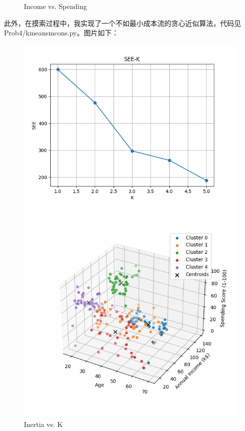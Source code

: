 \documentclass[8pt]{article}
\begin{document}
\begin{figure}[H]
\begin{minipage}{0.32\textwidth}
        \caption{Income vs. Spending}
        \label{fig: Annual Income vs. Spending Score k5 com con min20}
    \end{minipage}
    \hfill
\end{figure}

此外，在摸索过程中，我实现了一个不如最小成本流的贪心近似算法，代码见 {\color{blue}Prob4/kmeans\text{\_}mcons.py}。图片如下：

\begin{figure}[H]
    \centering
    \begin{minipage}{0.32\textwidth}
        \centering
        \includegraphics[width=\textwidth]{./Prob4/out/task3_2_mcom2/SEE-K.png}
        \caption{Inertia vs. K}
        \label{fig: Inertia vs. K mcom min20}
    \end{minipage}
    \hfill
    \begin{minipage}{0.32\textwidth}
        \centering
        \includegraphics[width=\textwidth]{./Prob4/out/task3_2_mcom2/images/cluster_result_k5_3d.png}

\end{minipage}
\end{figure}
\end{document}
